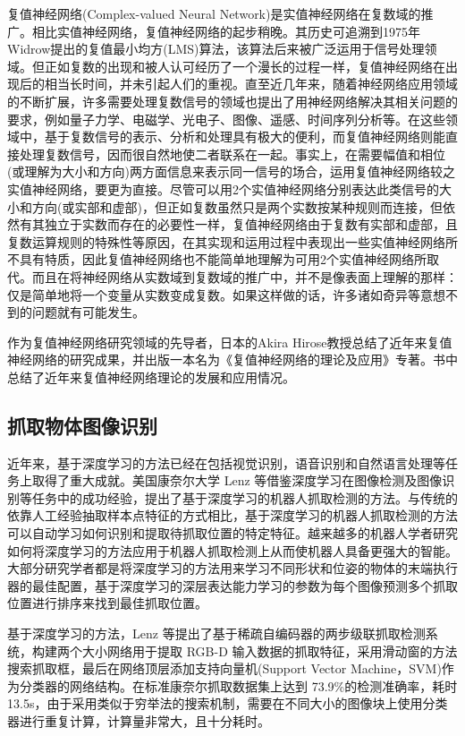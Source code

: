 \documentclass[no-math, withoutpreface]{YangThesis}
\begin{document}
复值神经网络(Complex-valued Neural Network)是实值神经网络在复数域的推广。相比实值神经网络，复值神经网络的起步稍晚。其历史可追溯到1975年Widrow提出的复值最小均方(LMS)算法，该算法后来被广泛运用于信号处理领域\cite{bibc9}。但正如复数的出现和被人认可经历了一个漫长的过程一样，复值神经网络在出现后的相当长时间，并未引起人们的重视。直至近几年来，随着神经网络应用领域的不断扩展，许多需要处理复数信号的领域也提出了用神经网络解决其相关问题的要求，例如量子力学、电磁学、光电子、图像、遥感、时间序列分析等。在这些领域中，基于复数信号的表示、分析和处理具有极大的便利，而复值神经网络则能直接处理复数信号，因而很自然地使二者联系在一起。事实上，在需要幅值和相位(或理解为大小和方向)两方面信息来表示同一信号的场合，运用复值神经网络较之实值神经网络，要更为直接。尽管可以用2个实值神经网络分别表达此类信号的大小和方向(或实部和虚部)，但正如复数虽然只是两个实数按某种规则而连接，但依然有其独立于实数而存在的必要性一样，复值神经网络由于复数有实部和虚部，且复数运算规则的特殊性等原因，在其实现和运用过程中表现出一些实值神经网络所不具有特质，因此复值神经网络也不能简单地理解为可用2个实值神经网络所取代。而且在将神经网络从实数域到复数域的推广中，并不是像表面上理解的那样：仅是简单地将一个变量从实数变成复数。如果这样做的话，许多诸如奇异等意想不到的问题就有可能发生\cite{bibc10}。

作为复值神经网络研究领域的先导者，日本的Akira Hirose教授总结了近年来复值神经网络的研究成果，并出版一本名为《复值神经网络的理论及应用》专著\cite{bibc10}。书中总结了近年来复值神经网络理论的发展和应用情况。

\subsection{抓取物体图像识别}

近年来，基于深度学习的方法已经在包括视觉识别\cite{bib1,bib2}，语音识别和自然语言处理等任务上取得了重大成就。美国康奈尔大学 Lenz 等\cite{bib3}借鉴深度学习在图像检测及图像识别等任务中的成功经验，提出了基于深度学习的机器人抓取检测的方法\cite{bib3,bib4}。与传统的依靠人工经验抽取样本点特征的方式相比，基于深度学习的机器人抓取检测的方法可以自动学习如何识别和提取待抓取位置的特定特征。越来越多的机器人学者研究如何将深度学习的方法应用于机器人抓取检测上从而使机器人具备更强大的智能。大部分研究学者都是将深度学习的方法用来学习不同形状和位姿的物体的末端执行器的最佳配置，基于深度学习的深层表达能力学习的参数为每个图像预测多个抓取位置进行排序来找到最佳抓取位置。

基于深度学习的方法，Lenz 等\cite{bib3}提出了基于稀疏自编码器的两步级联抓取检测系统，构建两个大小网络用于提取 RGB-D 输入数据的抓取特征，采用滑动窗的方法搜索抓取框，最后在网络顶层添加支持向量机(Support Vector Machine，SVM)作为分类器的网络结构。在标准康奈尔抓取数据集\cite{bib6}上达到 73.9\%的检测准确率，耗时13.5s，由于采用类似于穷举法的搜索机制，需要在不同大小的图像块上使用分类器进行重复计算，计算量非常大，且十分耗时。
\end{document}
